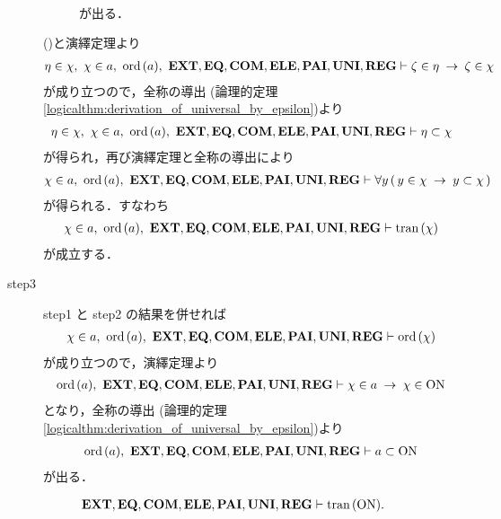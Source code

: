 \begin{sketch}
\begin{description}
\begin{description}
\begin{align}
						\end{align}
						が出る．
				\end{description}
				()と演繹定理より
				\begin{align}
					\eta \in \chi,\ \chi \in a,\ \ord{a},\ 
					\EXTAX,\EQAX,\COMAX,\ELEAX,\PAIAX,\UNIAX,\REGAX \vdash 
					\zeta \in \eta \rarrow \zeta \in \chi
				\end{align}
				が成り立つので，全称の導出
				(論理的定理\ref{logicalthm:derivation_of_universal_by_epsilon})より
				\begin{align}
					\eta \in \chi,\ \chi \in a,\ \ord{a},\ 
					\EXTAX,\EQAX,\COMAX,\ELEAX,\PAIAX,\UNIAX,\REGAX \vdash 
					\eta \subset \chi
				\end{align}
				が得られ，再び演繹定理と全称の導出により
				\begin{align}
					\chi \in a,\ \ord{a},\ 
					\EXTAX,\EQAX,\COMAX,\ELEAX,\PAIAX,\UNIAX,\REGAX \vdash 
					\forall y\, (\, y \in \chi \rarrow y \subset \chi\, )
				\end{align}
				が得られる．すなわち
				\begin{align}
					\chi \in a,\ \ord{a},\ 
					\EXTAX,\EQAX,\COMAX,\ELEAX,\PAIAX,\UNIAX,\REGAX \vdash \tran{\chi}
				\end{align}
				が成立する．
				
			\item[step3] step1 と step2 の結果を併せれば
				\begin{align}
					\chi \in a,\ \ord{a},\ 
					\EXTAX,\EQAX,\COMAX,\ELEAX,\PAIAX,\UNIAX,\REGAX \vdash \ord{\chi}
				\end{align}
				が成り立つので，演繹定理より
				\begin{align}
					\ord{a},\ \EXTAX,\EQAX,\COMAX,\ELEAX,\PAIAX,\UNIAX,\REGAX \vdash 
					\chi \in a \rarrow \chi \in \ON
				\end{align}
				となり，全称の導出
				(論理的定理\ref{logicalthm:derivation_of_universal_by_epsilon})より
				\begin{align}
					\ord{a},\ \EXTAX,\EQAX,\COMAX,\ELEAX,\PAIAX,\UNIAX,\REGAX \vdash 
					a \subset \ON
				\end{align}
				が出る．
				\QED
		\end{description}
	\end{sketch}
	
	\begin{screen}
		\begin{thm}[$\ON$は推移的]\label{thm:On_is_transitive}
			\begin{align}
				\mbox{{\bf EXT}},\mbox{{\bf EQ}},\mbox{\bf COM},\mbox{{\bf ELE}},\mbox{{\bf PAI}},\mbox{{\bf UNI}},\mbox{{\bf REG}} \vdash \operatorname*{tran}\hspace{0.15em}(\mathrm{ON}).
			\end{align}
		\end{thm}
	\end{screen}
	
